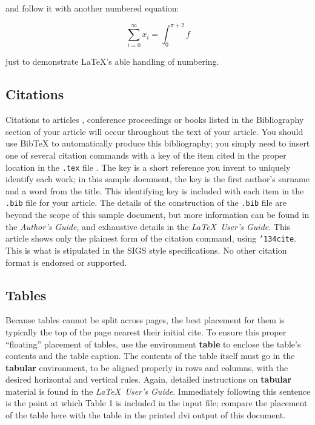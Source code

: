 \documentclass{sig-alternate-05-2015}
\begin{document}
and follow it with another numbered equation:

\begin{equation}
	\sum_{i=0}^{\infty}x_i=\int_{0}^{\pi+2} f
\end{equation}

just to demonstrate \LaTeX's able handling of numbering.

\subsection{Citations}
Citations to articles \cite{bowman:reasoning, clark:pct, braams:babel, herlihy:methodology}, conference proceedings \cite{clark:pct} or books \cite{salas:calculus, Lamport:LaTeX} listed in the Bibliography section of your article will occur throughout the text of your article. You should use BibTeX to automatically produce this bibliography; you simply need to insert one of several citation commands with a key of the item cited in the proper location in the \texttt{.tex} file \cite{Lamport:LaTeX}. The key is a short reference you invent to uniquely identify each work; in this sample document, the key is the first author's surname and a word from the title.  This identifying key is included with each item in the \texttt{.bib} file for your article.
The details of the construction of the \texttt{.bib} file are beyond the scope of this sample document, but more information can be found in the \textit{Author's Guide}, and exhaustive details in the \textit{\LaTeX\ User's Guide}\cite{Lamport:LaTeX}. This article shows only the plainest form of the citation command, using \texttt{{\char'134}cite}. This is what is stipulated in the SIGS style specifications. No other citation format is endorsed or supported. 

\subsection{Tables}
Because tables cannot be split across pages, the best placement for them is typically the top of the page nearest their initial cite.  To ensure this proper ``floating'' placement of tables, use the environment \textbf{table} to enclose the table's contents and the table caption.  The contents of the table itself must go in the \textbf{tabular} environment, to be aligned properly in rows and columns, with the desired horizontal and vertical rules.  Again, detailed instructions on \textbf{tabular} material is found in the \textit{\LaTeX\ User's Guide}.
Immediately following this sentence is the point at which  Table 1 is included in the input file; compare the placement of the table here with the table in the printed dvi output of this document. 
\end{document}
